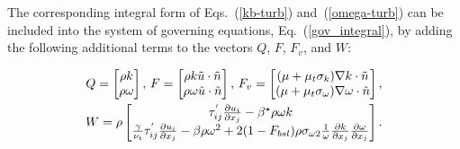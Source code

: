 
The corresponding integral form of Eqs.~(\ref{kb-turb}) and~(\ref{omega-turb})
can be included into the system of governing equations,
Eq.~(\ref{gov_integral}), by adding the
following additional terms to the vectors $Q$, $F$, $F_v$, and $W$:

\begin{eqnarray}
\nonumber
Q =
\begin{bmatrix}
\rho k \\
\rho \omega \\
\end{bmatrix}
,\,
F =
\begin{bmatrix}
\rho k \Tilde{u} \cdot \Tilde{n}\\
\rho \omega \Tilde{u} \cdot \Tilde{n} \\
\end{bmatrix}
, \,
F_v =
\begin{bmatrix}
(\mu+\mu_t\sigma_k)\nabla k \cdot \Tilde{n} \\
(\mu+\mu_t\sigma_\omega)\nabla \omega \cdot \Tilde{n} \\
\end{bmatrix}
, \\
W =\rho
\begin{bmatrix}
\tau_{ij}^{'}\frac{\partial u_i}{\partial x_j}-\beta^{\star}\rho\omega k\\
\frac{\gamma}{\nu_{t}}\tau_{ij}^{'}\frac{\partial u_i}
{\partial x_j} - \beta \rho \omega^{2}+2(1-F_{bsl})\rho 
\sigma_{\omega 2} \frac{1}{\omega} \frac{\partial k}
{\partial x_{j}} \frac{\partial \omega}{\partial x_{j}}\\
\end{bmatrix}.
\end{eqnarray}

